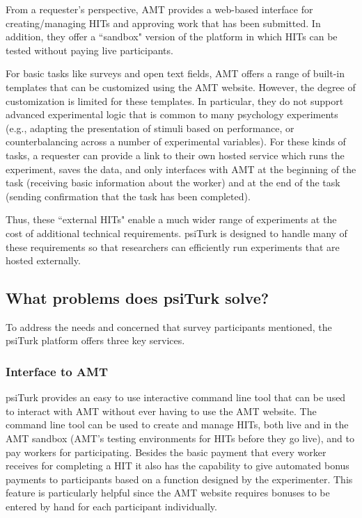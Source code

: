 \documentclass[twocolumn]{svjour3}          %
\begin{document}
From a requester's perspective, AMT provides a web-based interface for creating/managing HITs and approving work that has been submitted.
In addition, they offer a ``sandbox" version of the platform in which HITs can be tested without paying live participants.

For basic tasks like surveys and open text fields, AMT offers a range of built-in templates that can be customized using the AMT website.
However, the degree of customization is limited for these templates. 
In particular, they do not support advanced experimental logic that is common to many psychology experiments (e.g., adapting the presentation of stimuli based on performance, or counterbalancing across a number of experimental variables).
For these kinds of tasks, a requester can provide a link to their own hosted service which runs the experiment, saves the data, and only interfaces with AMT at the beginning of the task (receiving basic information about the worker) and at the end of the task (sending confirmation that the task has been completed).

Thus, these ``external HITs" enable a much wider range of experiments at the cost of additional technical requirements.
psiTurk is designed to handle many of these requirements so that researchers can efficiently run experiments that are hosted externally.


\subsection{What problems does psiTurk solve?}
To address the needs and concerned that survey participants mentioned, the psiTurk platform
 offers three key services.


\subsubsection{Interface to AMT}
psiTurk provides an easy to use interactive command line tool that can be used to 
interact with AMT without ever having to use the AMT website.  
The command line tool can be used to create and manage HITs, both live and in the AMT sandbox 
(AMT's testing environments for HITs before they go live), and to pay workers for
participating. Besides the basic payment that every worker receives for completing a HIT
it also has the capability to give automated bonus payments to participants based on a function
designed by the experimenter. This feature is particularly helpful since the AMT website
requires bonuses to be entered by hand for each participant individually.
\end{document}
